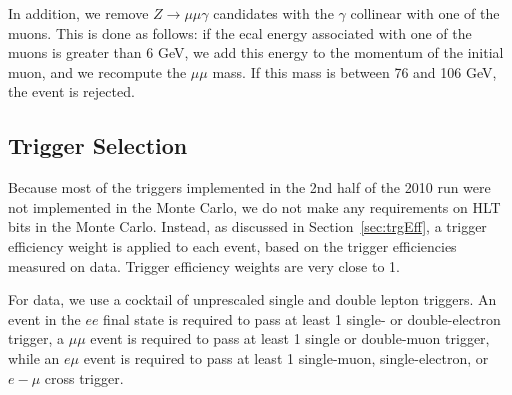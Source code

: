 In addition, we remove $Z \to \mu\mu\gamma$
candidates with the $\gamma$ collinear with one of the muons.  This is
done as follows:
if the ecal energy associated with one of the muons is greater than 6 GeV,
we add this energy to the momentum of the initial muon, and we recompute
the $\mu\mu$ mass.  If this mass is between 76 and 106 GeV, the event is rejected.


\subsection{Trigger Selection}
\label{sec:trigSel}

Because most of the triggers implemented in the 2nd half of the
2010 run were not implemented in the Monte Carlo, 
we do not make any requirements on HLT bits in the Monte Carlo.
Instead, as discussed in 
Section~\ref{sec:trgEff}, a trigger efficiency weight is applied
to each event, based on the trigger efficiencies measured on data.
Trigger efficiency weights are very close to 1.


For data, we use a cocktail of unprescaled single 
and double lepton triggers. An event
in the $ee$ final state is required to pass at least 1 
single- or double-electron trigger, a
$\mu\mu$ event is required to pass at least 1 single 
or double-muon trigger, while an $e\mu$ event
is required to pass at least 1 single-muon, single-electron, 
or $e-\mu$ cross trigger. 









